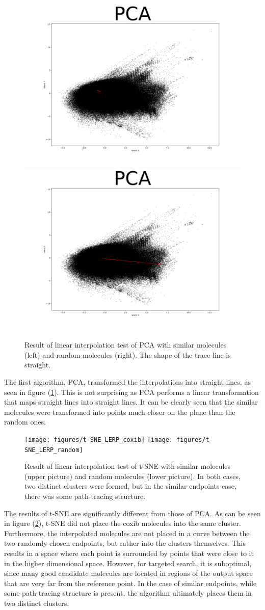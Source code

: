 \begin{figure}[h]
	\centering
	\includegraphics[width=0.49\columnwidth]{figures/PCA_LERP_coxib}
	\includegraphics[width=0.49\columnwidth]{figures/PCA_LERP_random}
	\caption{Result of linear interpolation test of PCA with similar molecules (left) and random molecules (right). The shape of the trace line is straight.}
	\label{fig:pca:lerp}
\end{figure}

The first algorithm, PCA, transformed the interpolations into straight lines, as seen in figure (\ref{fig:pca:lerp}). This is not surprising as PCA performs a linear transformation that maps straight lines into straight lines. It can be clearly seen that the similar molecules were transformed into points much closer on the plane than the random ones.

\begin{figure}[!ht]
	\centering
	\texttt{[image: figures/t-SNE\_LERP\_coxib]}
	\texttt{[image: figures/t-SNE\_LERP\_random]}
	\caption{Result of linear interpolation test of t-SNE with similar molecules (upper picture) and random molecules (lower picture). In both cases, two distinct clusters were formed, but in the similar endpoints case, there was some path-tracing structure.}
	\label{fig:tsne:lerp}
\end{figure}

The results of t-SNE are significantly different from those of PCA. As can be seen in figure (\ref{fig:tsne:lerp}), t-SNE did not place the coxib molecules into the same cluster. Furthermore, the interpolated molecules are not placed in a curve between the two randomly chosen endpoints, but rather into the clusters themselves. This results in a space where each point is surrounded by points that were close to it in the higher dimensional space. However, for targeted search, it is suboptimal, since many good candidate molecules are located in regions of the output space that are very far from the reference point. In the case of similar endpoints, while some path-tracing structure is present, the algorithm ultimately places them in two distinct clusters.

